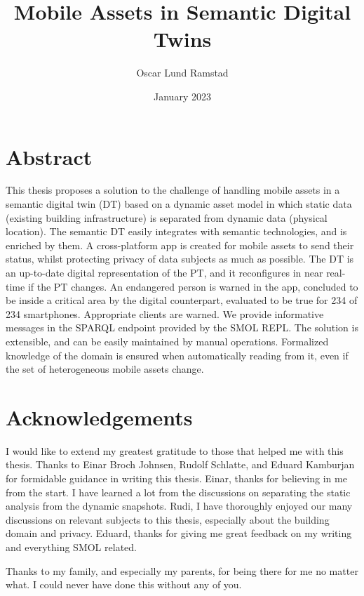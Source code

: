 \documentclass{article}
\begin{document}
\title{Mobile Assets in Semantic Digital Twins}
\author{Oscar Lund Ramstad}
\date{January 2023}

\duoforside[dept={Institute for Informatics}, program={Informatics: Programming and System Architecture}, short]

\section*{Abstract}
This thesis proposes a solution to the challenge of handling mobile assets in a semantic digital twin (DT) based on a dynamic asset model in which static data (existing building infrastructure) is separated from dynamic data (physical location). The semantic DT easily integrates with semantic technologies, and is enriched by them. A cross-platform app is created for mobile assets to send their status, whilst protecting privacy of data subjects as much as possible. The DT is an up-to-date digital representation of the PT, and it reconfigures in near real-time if the PT changes. An endangered person is warned in the app, concluded to be inside a critical area by the digital counterpart, evaluated to be true for 234 of 234 smartphones. Appropriate clients are warned. We provide informative messages in the SPARQL endpoint provided by the SMOL REPL. The solution is extensible, and can be easily maintained by manual operations. Formalized knowledge of the domain is ensured when automatically reading from it, even if the set of heterogeneous mobile assets change.

\newpage

\section*{Acknowledgements}
I would like to extend my greatest gratitude to those that helped me with this thesis. Thanks to Einar Broch Johnsen, Rudolf Schlatte, and Eduard Kamburjan for formidable guidance in writing this thesis. Einar, thanks for believing in me from the start. I have learned a lot from the discussions on separating the static analysis from the dynamic snapshots. Rudi, I have thoroughly enjoyed our many discussions on relevant subjects to this thesis, especially about the building domain and privacy. Eduard, thanks for giving me great feedback on my writing and everything SMOL related.

Thanks to my family, and especially my parents, for being there for me no matter what. I could never have done this without any of you.      
\newpage
\end{document}
